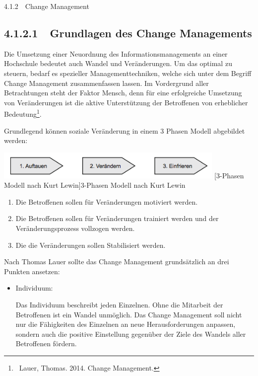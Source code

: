 \documentclass{article}
\begin{document}
\bigskip

4.1.2\ \ Change Management

\subsection[4.1.2.1\ \ Grundlagen des Change Managements]{4.1.2.1\ \ Grundlagen des Change Managements}
Die Umsetzung einer Neuordnung des Informationsmanagements an einer Hochschule bedeutet auch Wandel und Veränderungen.
Um das optimal zu steuern, bedarf es spezieller Managementtechniken, welche sich unter dem Begriff Change Management
zusammenfassen lassen. Im Vordergrund aller Betrachtungen steht der Faktor Mensch, denn für eine erfolgreiche Umsetzung
von Veränderungen ist die aktive Unterstützung der Betroffenen von erheblicher Bedeutung\footnote{\ Lauer, Thomas.
2014. Change Management.}.


\bigskip

Grundlegend können soziale Veränderung in einem 3 Phasen Modell abgebildet werden:



\begin{center}
\includegraphics[width=11.098cm,height=1.372cm]{INM41HalfmannChristianAbgabe150531-img/INM41HalfmannChristianAbgabe150531-img001.png}
[3{}-Phasen Modell nach Kurt Lewin]{3-Phasen Modell nach Kurt Lewin}

\end{center}
\begin{enumerate}
\item Die Betroffenen sollen für Veränderungen motiviert werden.
\item Die Betroffenen sollen für Veränderungen trainiert werden und der Veränderungsprozess vollzogen werden. \ 
\item Die die Veränderungen sollen Stabilisiert werden. 
\end{enumerate}

\bigskip

Nach Thomas Lauer sollte das Change Management grundsätzlich an drei Punkten ansetzen:


\bigskip

\begin{itemize}
\item Individuum:

Das Individuum beschreibt jeden Einzelnen. Ohne die Mitarbeit der Betroffenen ist ein Wandel unmöglich. Das Change
Management soll nicht nur die Fähigkeiten des Einzelnen an neue Herausforderungen anpassen, sondern auch die positive
Einstellung gegenüber der Ziele des Wandels aller Betroffenen fördern. \ 
\end{itemize}
\end{document}
